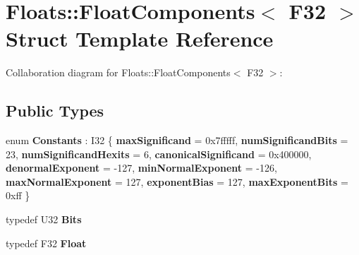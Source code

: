 \hypertarget{struct_floats_1_1_float_components_3_01_f32_01_4}{}\section{Floats\+:\+:Float\+Components$<$ F32 $>$ Struct Template Reference}
\label{struct_floats_1_1_float_components_3_01_f32_01_4}


Collaboration diagram for Floats\+:\+:Float\+Components$<$ F32 $>$\+:
\subsection*{Public Types}
\begin{DoxyCompactItemize}
\item 
\mbox{\label{struct_floats_1_1_float_components_3_01_f32_01_4_adadea8a85095bfbe8e68ecc2372f635a}} 
enum {\bfseries Constants} \+: I32 \{ \newline
{\bfseries max\+Significand} = 0x7fffff, 
{\bfseries num\+Significand\+Bits} = 23, 
{\bfseries num\+Significand\+Hexits} = 6, 
{\bfseries canonical\+Significand} = 0x400000, 
\newline
{\bfseries denormal\+Exponent} = -\/127, 
{\bfseries min\+Normal\+Exponent} = -\/126, 
{\bfseries max\+Normal\+Exponent} = 127, 
{\bfseries exponent\+Bias} = 127, 
\newline
{\bfseries max\+Exponent\+Bits} = 0xff
 \}
\item 
\mbox{\label{struct_floats_1_1_float_components_3_01_f32_01_4_a7b1a7333fe4e4fb18fec0b1cf5298b53}} 
typedef U32 {\bfseries Bits}
\item 
\mbox{\label{struct_floats_1_1_float_components_3_01_f32_01_4_a5bf95f5628d5bed711f50a997671bef5}} 
typedef F32 {\bfseries Float}
\end{DoxyCompactItemize}
